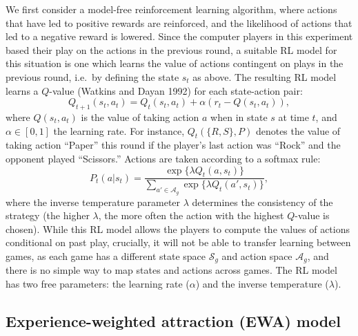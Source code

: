\documentclass[smallextended]{svjour3}       %
\begin{document}
We first consider a model-free reinforcement learning algorithm, where
actions that have led to positive rewards are reinforced, and the
likelihood of actions that led to a negative reward is lowered. Since
the computer players in this experiment based their play on the actions
in the previous round, a suitable RL model for this situation is one
which learns the value of actions contingent on plays in the previous
round, i.e.~by defining the state \(s_{t}\) as above. The resulting RL
model learns a \(Q\)-value (Watkins and Dayan 1992) for each
state-action pair:
\[Q_{t+1}(s_{t},a_{t}) = Q_{t}(s_{t},a_{t}) + \alpha \left( r_{t}  - Q(s_{t},a_{t}) \right) ,\]
where \(Q(s_{t},a_{t})\) is the value of taking action \(a\) when in
state \(s\) at time \(t\), and \(\alpha \in [0,1]\) the learning rate.
For instance, \(Q_t(\{R,S\},P)\) denotes the value of taking action
``Paper'' this round if the player's last action was ``Rock'' and the
opponent played ``Scissors.'' Actions are taken according to a softmax
rule: \begin{equation}
\label{eq:softmax}
P_{t}(a|s_t) = \frac{\exp \{ \lambda Q_{t}(a,s_t) \}}{\sum_{a' \in \mathcal{A}_g} \exp \{\lambda  Q_{t}(a',s_t) \}}, 
\end{equation} where the inverse temperature parameter \(\lambda\)
determines the consistency of the strategy (the higher \(\lambda\), the
more often the action with the highest \(Q\)-value is chosen). While
this RL model allows the players to compute the values of actions
conditional on past play, crucially, it will not be able to transfer
learning between games, as each game has a different state space
\(\mathcal{S}_g\) and action space \(\mathcal{A}_g\), and there is no
simple way to map states and actions across games. The RL model has two
free parameters: the learning rate (\(\alpha\)) and the inverse
temperature (\(\lambda\)).

\hypertarget{experience-weighted-attraction-ewa-model}{%
\subsection{Experience-weighted attraction (EWA)
model}\label{experience-weighted-attraction-ewa-model}}
\end{document}

